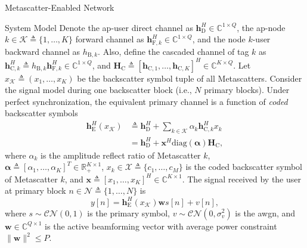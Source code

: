 \documentclass[journal]{IEEEtran}
\begin{document}
\begin{section}{Metascatter-Enabled Network}
\begin{subsection}{System Model}
		Denote the \gls{ap}-user direct channel as $\boldsymbol{h}_{\mathrm{D}}^H \in \mathbb{C}^{1 \times Q}$, the \gls{ap}-node $k \in \mathcal{K} \triangleq \{1,\ldots,K\}$ forward channel as $\boldsymbol{h}_{\mathrm{F},k}^H \in \mathbb{C}^{1 \times Q}$, and the node $k$-user backward channel as $h_{\mathrm{B},k}$. Also, define the cascaded channel of tag $k$ as $\boldsymbol{h}_{\mathrm{C},k}^H \triangleq h_{\mathrm{B},k} \boldsymbol{h}_{\mathrm{F},k}^H \in \mathbb{C}^{1 \times Q}$, and $\boldsymbol{H}_{\mathrm{C}} \triangleq [\boldsymbol{h}_{\mathrm{C},1},\ldots,\boldsymbol{h}_{\mathrm{C},K}]^H \in \mathbb{C}^{K \times Q}$.
		Let $x_{\mathcal{K}} \triangleq (x_1,\ldots,x_K)$ be the backscatter symbol tuple of all Metascatters.
		Consider the signal model during one backscatter block (i.e., $N$ primary blocks).
		Under perfect synchronization, the equivalent primary channel is a function of \emph{coded} backscatter symbols
		\begin{subequations}
			\label{eq:equivalent_channel}
			\begin{align}
				\boldsymbol{h}_{\mathrm{E}}^H(x_{\mathcal{K}})
				 & \triangleq \boldsymbol{h}_{\mathrm{D}}^H + \sum_{k \in \mathcal{K}} \alpha_k \boldsymbol{h}_{\mathrm{C},k}^H x_k   \\
				 & = \boldsymbol{h}_{\mathrm{D}}^H + \boldsymbol{x}^H \mathrm{diag}(\boldsymbol{\alpha}) \boldsymbol{H}_{\mathrm{C}},
			\end{align}
		\end{subequations}
		where $\alpha_k$ is the amplitude reflect ratio of Metascatter $k$, $\boldsymbol{\alpha} \triangleq [\alpha_1,\ldots,\alpha_K]^T \in \mathbb{R}_+^{K \times 1}$, $x_k \in \mathcal{X} \triangleq \{c_1,\ldots,c_M\}$ is the coded backscatter symbol of Metascatter $k$, and $\boldsymbol{x} \triangleq [x_1,\ldots,x_K]^H \in \mathbb{C}^{K \times 1}$. The signal received by the user at primary block $n \in \mathcal{N} \triangleq \{1,\ldots,N\}$ is
		\begin{equation}
			y[n] = \boldsymbol{h}_{\mathrm{E}}^H(x_{\mathcal{K}}) \boldsymbol{w} s[n] + v[n],
		\end{equation}
		where $s \sim \mathcal{CN}(0,1)$ is the primary symbol, $v \sim \mathcal{CN}(0,\sigma_v^2)$ is the \gls{awgn}, and $\boldsymbol{w} \in \mathbb{C}^{Q \times 1}$ is the active beamforming vector with average power constraint $\lVert \boldsymbol{w} \rVert^2 \le P$.

\end{subsection}
\end{section}
\end{document}
